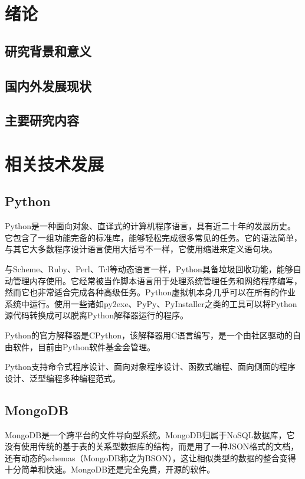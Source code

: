 \section{绪论}

\subsection{研究背景和意义}


\subsection{国内外发展现状}

\subsection{主要研究内容}

\section{相关技术发展}

\subsection{Python}

Python是一种面向对象、直译式的计算机程序语言，具有近二十年的发展历史。它包含了一组功能完备的标准库，能够轻松完成很多常见的任务。它的语法简单，与其它大多数程序设计语言使用大括号不一样，它使用缩进来定义语句块。

与Scheme、Ruby、Perl、Tcl等动态语言一样，Python具备垃圾回收功能，能够自动管理内存使用。它经常被当作脚本语言用于处理系统管理任务和网络程序编写，然而它也非常适合完成各种高级任务。Python虚拟机本身几乎可以在所有的作业系统中运行。使用一些诸如py2exe、PyPy、PyInstaller之类的工具可以将Python源代码转换成可以脱离Python解释器运行的程序。

Python的官方解释器是CPython，该解释器用C语言编写，是一个由社区驱动的自由软件，目前由Python软件基金会管理。

Python支持命令式程序设计、面向对象程序设计、函数式编程、面向侧面的程序设计、泛型编程多种编程范式。\cite{python}

\subsection{MongoDB}

MongoDB是一个跨平台的文件导向型系统。MongoDB归属于NoSQL数据库，它没有使用传统的基于表的关系型数据库的结构，而是用了一种JSON格式的文档，还有动态的schemas（MongoDB称之为BSON），这让相似类型的数据的整合变得十分简单和快速。MongoDB还是完全免费，开源的软件。

